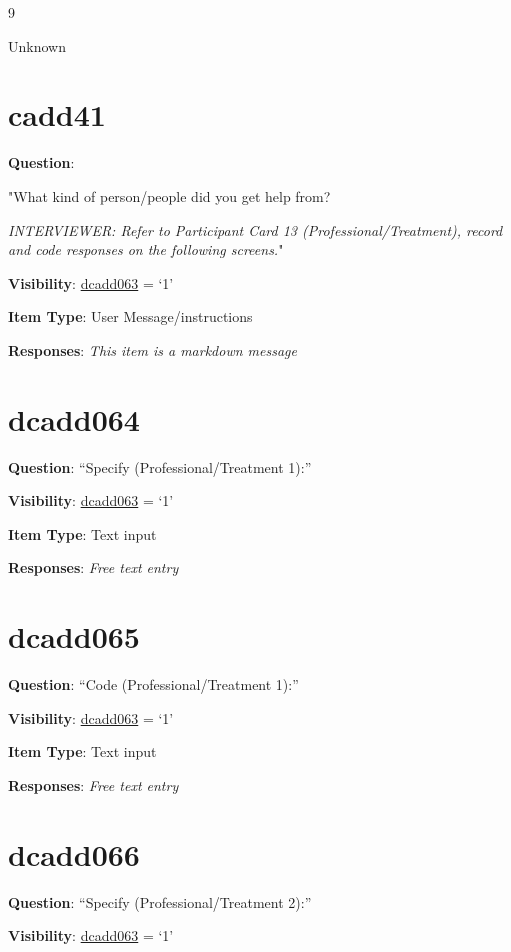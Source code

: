 \documentclass[]{book}
\begin{document}
9

Unknown

\hypertarget{cadd41}{%
\section{cadd41}\label{cadd41}}

\textbf{Question}:

"What kind of person/people did you get help from?

\emph{INTERVIEWER: Refer to Participant Card 13 (Professional/Treatment), record and code responses on the following screens.}"

\textbf{Visibility}: \protect\hyperlink{dcadd063}{dcadd063} = `1'

\textbf{Item Type}: User Message/instructions

\textbf{Responses}: \emph{This item is a markdown message}

\hypertarget{dcadd064}{%
\section{dcadd064}\label{dcadd064}}

\textbf{Question}: ``Specify (Professional/Treatment 1):''

\textbf{Visibility}: \protect\hyperlink{dcadd063}{dcadd063} = `1'

\textbf{Item Type}: Text input

\textbf{Responses}: \emph{Free text entry}

\hypertarget{dcadd065}{%
\section{dcadd065}\label{dcadd065}}

\textbf{Question}: ``Code (Professional/Treatment 1):''

\textbf{Visibility}: \protect\hyperlink{dcadd063}{dcadd063} = `1'

\textbf{Item Type}: Text input

\textbf{Responses}: \emph{Free text entry}

\hypertarget{dcadd066}{%
\section{dcadd066}\label{dcadd066}}

\textbf{Question}: ``Specify (Professional/Treatment 2):''

\textbf{Visibility}: \protect\hyperlink{dcadd063}{dcadd063} = `1'
\end{document}
